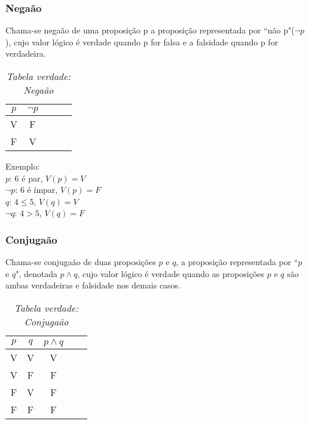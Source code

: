 \subsubsection{Negaão}
\begin{definicao}[Negaão] Chama-se negaão de uma proposição p a proposição representada por ``não p"($\neg p$), cujo valor lógico é verdade quando p for falsa e a falsidade quando p for verdadeira.\end{definicao}
\begin{table}[h]
   \centering
   \setlength{\arrayrulewidth}{0,5\arrayrulewidth}
   \caption{\it Tabela verdade: Negaão}
   \begin{tabular}{|c|c|c|c|c|}
      \hline
     $ p$ & $\neg p$ \\
      \hline
      V & F \\
      \hline
      F & V \\
      \hline
   \end{tabular}
\end{table}

Exemplo:\\
\textbf{$p$}: 6 é par, $V(p)=V$\\
\textbf{$\neg p$}: 6 é ímpar, $V(p)=F$\\
\textbf{$q$}: $4\leq 5$, $V(q)=V$\\
\textbf{$\neg q$}: $4>5$, $V(q)=F$

\subsubsection{Conjugaão}

\begin{definicao}[Conjugaão] Chama-se conjugaão de duas proposições $p$ e $q$, a proposição representada por ``$p$ e $q$", denotada $p\wedge q$, cujo valor lógico é verdade quando as proposições $p$ e $q$ são ambas verdadeiras e falsidade nos demais casos.\end{definicao}
\begin{table}[h]
   \centering
   \setlength{\arrayrulewidth}{0,5\arrayrulewidth}
   \caption{\it Tabela verdade: Conjugaão}
   \begin{tabular}{|c|c|c|c|c|}
      \hline
      $p$ & $q$ & $p\wedge q$ \\
      \hline
      V & V & V \\
      \hline
      V & F & F \\
      \hline
      F & V & F \\
      \hline
      F & F & F \\
      \hline
   \end{tabular}
\end{table}

